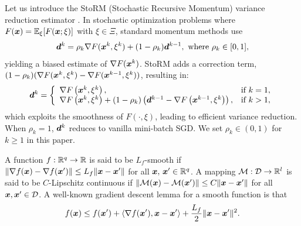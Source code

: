 Let us introduce the StoRM (Stochastic Recursive Momentum) variance reduction estimator \cite{cutkoskyMomentumBasedVarianceReduction2019}. In stochastic optimization problems where $F(\bm{x}) = \mathbb{E}_{\xi}[F(\bm{x};\xi)]$ with $\xi \in \Xi$, 
standard momentum methods use
\begin{align*}
    \bm{d}^{k}= \rho_{k}\nabla F(\bm{x}^{k}, \xi^{k}) + (1 - \rho_{k}) \bm{d}^{k-1}, \text{ where }\rho_{k}\in [0, 1],
\end{align*}
yielding a biased estimate of $\nabla F(\bm{x}^{k})$.
StoRM adds a
correction term, $(1 - \rho_{k}) (\nabla F(\bm{x}^{k}, \xi^{k}) - \nabla F(\bm{x}^{k-1}, \xi^{k}))$, resulting in:
\begin{align*}
     \bm{d}^{k}=\left\{\begin{array}{ll}\nabla F\left(\bm{x}^{k}, \xi^{k}\right), & \text{if } k=1, \\ \nabla F\left(\bm{x}^{k}, \xi^{k}\right) + \left(1-\rho_k\right)\left( \bm{d}^{k-1} - \nabla F\left(\bm{x}^{k-1}, \xi^{k}\right) \right), & \text{if } k>1,\end{array}\right. 
\end{align*}
which exploits the smoothness of $F(\cdot, \xi)$, leading to efficient variance reduction. When $\rho_{k}= 1$, $\bm{d}^{k}$ reduces to vanilla mini-batch SGD. We set $\rho_{k}\in (0,1)$ for $k \geq 1$ in this paper.

A function $f: \mathbb{R}^q \rightarrow \mathbb{R}$ is said to be $L_f$-smooth if  $\| \nabla f(\bm{x}) - \nabla f(\bm{x}') \| \leq L_f \| \bm{x} - \bm{x}'\|$ for all $\bm{x},\, \bm{x}' \in \mathbb{R}^q$. A mapping $\mathcal{M} : \mathcal{D} \to \mathbb{R}^l $ is said to be $C$-Lipschitz continuous if $\|\mathcal{M}(\bm{x}) - \mathcal{M}(\bm{x}')\| \leq C\|\bm{x} - \bm{x}'\|$ for all $\bm{x}, \bm{x}' \in \mathcal{D}$. A well-known gradient descent lemma for a smooth function is that
\begin{align}
    f(\bm{x}) \leq f(\bm{x}') + \langle \nabla f(\bm{x}'), \bm{x} - \bm{x}' \rangle + \frac{L_f}{2} \| \bm{x} - \bm{x}'\|^2. \notag
\end{align}
